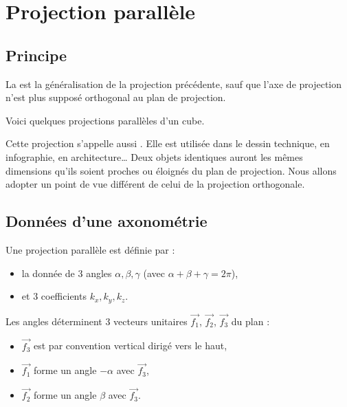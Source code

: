 \documentclass[11pt,class=report,crop=false]{standalone}
\begin{document}
\section{Projection parallèle}


\subsection{Principe}

La  est la généralisation de la projection précédente, sauf que l'axe de projection n'est plus supposé orthogonal au plan de projection.



Voici quelques projections parallèles d'un cube.


Cette projection s'appelle aussi .
Elle est utilisée dans le dessin technique, en infographie, en architecture\ldots{} 
Deux objets identiques auront les mêmes dimensions qu'ils soient proches ou éloignés du plan de projection. 
Nous allons adopter un point de vue différent de celui de la projection orthogonale.

\subsection{Données d'une axonométrie}

Une projection parallèle est définie par :
\begin{itemize}
  \item la donnée de $3$ angles $\alpha,\beta,\gamma$ (avec $\alpha+\beta+\gamma=2\pi$),
  \item et $3$ coefficients $k_x,k_y,k_z$.
\end{itemize}

Les angles déterminent $3$ vecteurs unitaires $\vec {f_1}$, $\vec {f_2}$, $\vec {f_3}$ du plan :
\begin{itemize}
  \item $\vec {f_3}$ est par convention vertical dirigé vers le haut,
  \item $\vec {f_1}$ forme un angle $-\alpha$ avec $\vec {f_3}$,
  \item $\vec {f_2}$ forme un angle $\beta$ avec $\vec {f_3}$.
\end{itemize}
\end{document}
